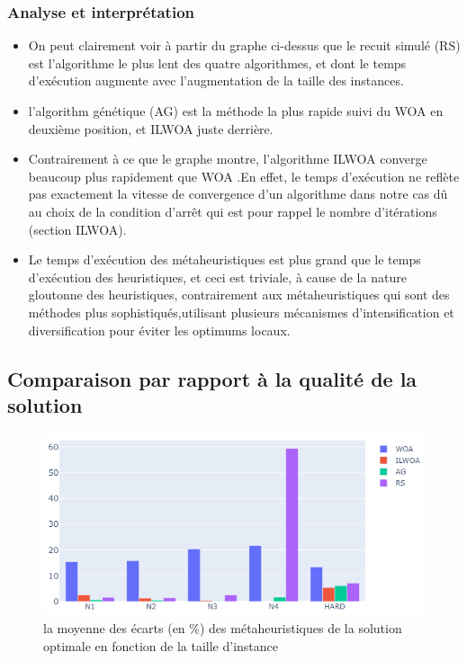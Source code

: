 \documentclass[12pt]{article}
\begin{document}
        \subsubsection{Analyse et interprétation}
            \begin{itemize}
                \item On peut clairement voir à partir du  graphe ci-dessus que le recuit simulé (RS) est l’algorithme le plus lent des quatre algorithmes, et dont le temps d'exécution augmente avec l’augmentation de la taille des instances. 
                \item l’algorithm génétique (AG)  est la méthode la plus rapide suivi du WOA en deuxième position, et ILWOA juste derrière.
                \item Contrairement à ce que le graphe montre, l’algorithme ILWOA converge beaucoup plus rapidement que WOA .En effet, le temps d'exécution ne reflète pas exactement la vitesse de convergence d’un algorithme dans notre cas dû au choix de la condition d'arrêt qui est pour rappel le nombre d'itérations (section ILWOA).
                \item Le temps d'exécution des métaheuristiques est plus grand que le temps d'exécution des heuristiques, et ceci est triviale, à cause de la nature gloutonne des heuristiques, contrairement aux métaheuristiques qui sont des méthodes plus sophistiqués,utilisant plusieurs mécanismes d’intensification et diversification pour éviter les optimums locaux.
            \end{itemize}
    \subsection{Comparaison par rapport à la qualité de la solution}
        \begin{figure}[H]
            \includegraphics[width=\linewidth]{../figures/mh_ecart.png}
            \caption{la moyenne des écarts (en \%) des métaheuristiques de la solution optimale en fonction de la taille d'instance}
        \end{figure}
\end{document}
